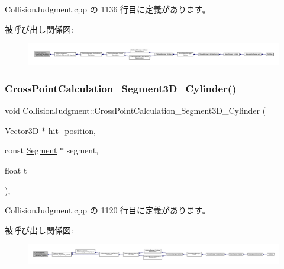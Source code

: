 Collision\+Judgment.\+cpp の 1136 行目に定義があります。

被呼び出し関係図\+:
\nopagebreak
\begin{figure}[H]
\begin{center}
\leavevmode
\includegraphics[width=350pt]{class_collision_judgment_a9d7bd7435d9e116c8d0dfb62662e60d5_icgraph}
\end{center}
\end{figure}
\mbox{\label{class_collision_judgment_ad369f21f29dfe28a337d10d8a9a06874}} 
\subsubsection{\texorpdfstring{Cross\+Point\+Calculation\+\_\+\+Segment3\+D\+\_\+\+Cylinder()}{CrossPointCalculation\_Segment3D\_Cylinder()}}
{\footnotesize\ttfamily void Collision\+Judgment\+::\+Cross\+Point\+Calculation\+\_\+\+Segment3\+D\+\_\+\+Cylinder (\begin{DoxyParamCaption}\item[{\mbox{\hyperlink{class_vector3_d}{Vector3D}} $\ast$}]{hit\+\_\+position,  }\item[{const \mbox{\hyperlink{class_segment}{Segment}} $\ast$}]{segment,  }\item[{float}]{t }\end{DoxyParamCaption})\hspace{0.3cm}{\ttfamily [static]}, {\ttfamily [private]}}



 Collision\+Judgment.\+cpp の 1120 行目に定義があります。

被呼び出し関係図\+:
\nopagebreak
\begin{figure}[H]
\begin{center}
\leavevmode
\includegraphics[width=350pt]{class_collision_judgment_ad369f21f29dfe28a337d10d8a9a06874_icgraph}
\end{center}
\end{figure}
\mbox{\label{class_collision_judgment_a1a36d9be481597ed39b42e6f261ee508}} 

